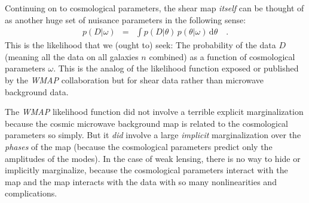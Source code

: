 \documentclass[12pt, pdftex]{article}
\newcommand{\dd}{\mathrm{d}}
\newcommand{\shearpars}{\theta}
\newcommand{\cosmopars}{\omega}
\newcommand{\data}{D}
\begin{document}
Continuing on to cosmological parameters, the shear map \emph{itself}
can be thought of as another huge set of nuisance parameters in the
following sense:
\begin{eqnarray}\displaystyle
p(\data|\cosmopars) &=&
\int p(\data|\shearpars)\,p(\shearpars|\cosmopars)\,\dd\shearpars
\quad.
\end{eqnarray}
This is the likelihood that we (ought to) seek: The probability of the
data $\data$ (meaning all the data on all galaxies $n$ combined) as a
function of cosmological parameters $\cosmopars$.  This is the analog
of the likelihood function exposed or published by the \textsl{WMAP}
collaboration but for shear data rather than microwave background
data.

The \textsl{WMAP} likelihood function did not involve a terrible
explicit marginalization because the cosmic microwave background map
is related to the cosmological parameters so simply.  But it
\emph{did} involve a large \emph{implicit} marginalization over the
\emph{phases} of the map (because the cosmological parameters predict
only the amplitudes of the modes).  In the case of weak lensing, there
is no way to hide or implicitly marginalize, because the cosmological
parameters interact with the map and the map interacts with the data
with so many nonlinearities and complications.
\end{document}
